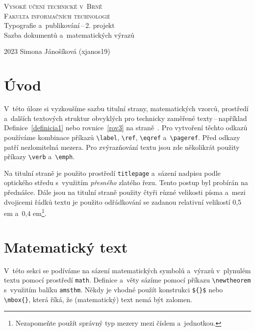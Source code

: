\documentclass[a4paper, twocolumn, 11pt]{article}
\begin{document}
    \begin{titlepage}
        \begin{center}
           \textsc {\Huge{Vysoké učení technické v~Brně}\\[0,5em]
                     \huge{Fakulta informačních technologií}\\[0,4em]}
            {\LARGE Typografie a~publikování\,--\,2. projekt\\[0,5em]
        	      Sazba dokumentů a~matematických výrazů\\[0,4em]}
        \end{center}
        {\Large 2023 \hfill Simona Jánošíková (xjanos19)}
    \end{titlepage}

\section*{Úvod}
V~této úloze si vyzkoušíme sazbu titulní strany, matematických vzorců, prostředí a~dalších textových struktur obvyklých pro technicky zaměřené texty\,--\,například Definice~\ref{definicia1} nebo rovnice~\eqref{rov3} na straně~\pageref{rov3}. Pro vytvoření těchto odkazů používáme kombinace příkazů \verb|\label|, \verb|\ref|, \verb|\eqref| a~\verb|\pageref|. Před odkazy patří nezlomitelná mezera. Pro zvýrazňování textu jsou zde několikrát použity příkazy \verb|\verb| a~\verb|\emph|. 

Na titulní straně je použito prostředí \verb|titlepage| a~sázení nadpisu podle optického středu s~využitím \emph{přesného} zlatého řezu. Tento postup byl probírán na přednášce. Dále jsou na titulní straně použity čtyři různé velikosti písma a~mezi dvojicemi řádků textu je použito odřádkování se zadanou relativní velikostí 0,5 em a~0,4 em\footnote{Nezapomeňte použít správný typ mezery mezi číslem a~jednotkou.}.

\section{Matematický text}
V~této sekci se podíváme na sázení matematických symbolů a~výrazů v~plynulém textu pomocí prostředí \verb|math|. Definice a~věty sázíme pomocí příkazu \verb|\newtheorem| s~využitím balíku \verb|amsthm|. Někdy je vhodné použít konstrukci \verb|${}$| nebo \verb|\mbox{}|, která říká, že (matematický) text nemá být zalomen. 
\end{document}
